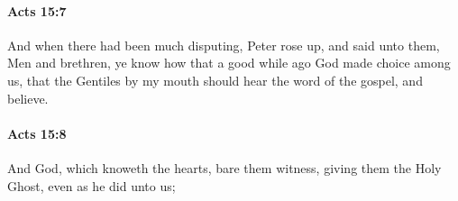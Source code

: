 		\paragraph{Acts 15:7} %
			\label{ACTS-15-7}

			And when there had been much disputing, Peter rose up, and said unto them, Men and brethren, ye know how that a good while ago God made choice among us, that the Gentiles by my mouth should hear the word of the gospel, and believe.

			\begin{framed}
			\scriptsize
				\begin{compactdesc}
					\item[SBLG] 
				\end{compactdesc}
			\end{framed}

		\paragraph{Acts 15:8} %
			\label{ACTS-15-8}

			And God, which knoweth the hearts, bare them witness, giving them the Holy Ghost, even as he did unto us;

